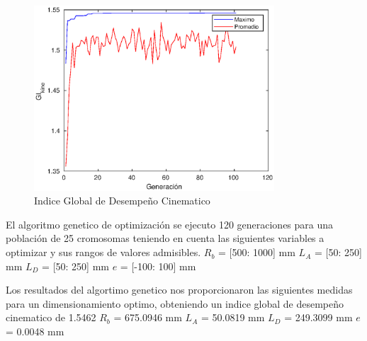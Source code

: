 \begin{figure}[ht!]
    \centering
    \includegraphics[height = 0.4\textheight,width=0.8\textwidth]{Cap4_DisenoBasico/Figura/Ga/IndiceenlasGeneraciones.eps}
    \caption{Indice Global de Desempeño Cinematico}
    \label{fig:Generaciones}
\end{figure}
\newpage
El algoritmo genetico de optimización se ejecuto 120 generaciones para una población de 25 cromosomas teniendo en cuenta las siguientes variables a optimizar y sus rangos de valores admisibles.\newline
$R_b$ = [500: 1000] mm \newline
$L_A$ = [50: 250] mm \newline
$L_D$ = [50: 250] mm \newline
$e$  = [-100: 100] mm \newline

Los resultados del algortimo genetico nos proporcionaron las siguientes medidas para un dimensionamiento optimo, obteniendo un indice global de desempeño cinematico de 1.5462 \newline
$R_b$ =  675.0946 mm \newline
$L_A$ = 50.0819 mm \newline
$L_D$ = 249.3099 mm \newline
$e$  = 0.0048 mm \newline

